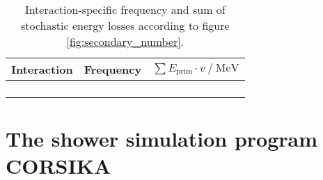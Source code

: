 \begin{table}
	\centering
	\caption[]{Interaction-specific frequency and sum of stochastic energy losses according to figure \ref{fig:secondary_number}.}
	\label{tab:secondary_number}
	\begin{tabular}{l S S}
		\toprule
		{Interaction} & {Frequency} & {$\sum E_\text{prim} \cdot v \:/\: \si{\mega\electronvolt}$} \\	
		\midrule
		 & \epaircount & \epairsum \\
		 & \bremscount & \bremssum \\
		 & \photocount & \photosum \\
		 & \ionizcount & \ionizsum \\
		\bottomrule
	\end{tabular}
\end{table}


\section{The shower simulation program CORSIKA}